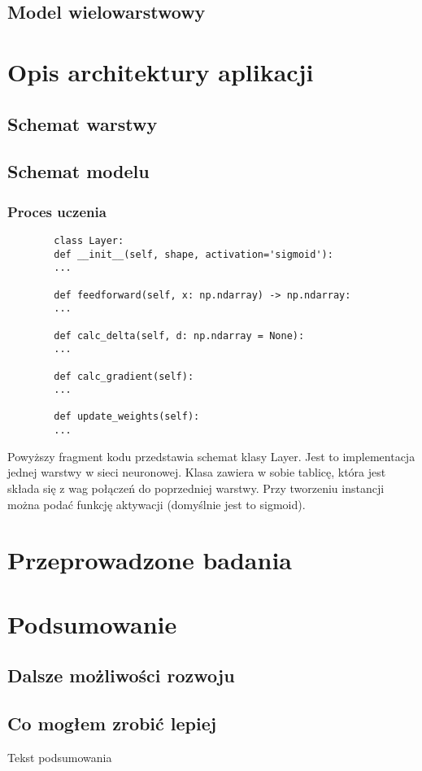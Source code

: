 \documentclass{report}
\begin{document}
    \section{Model wielowarstwowy}

    \chapter{Opis architektury aplikacji}

    \section{Schemat warstwy}

    \section{Schemat modelu}

    \subsection{Proces uczenia}

    \begin{lstlisting}
        class Layer:
        def __init__(self, shape, activation='sigmoid'):
        ...

        def feedforward(self, x: np.ndarray) -> np.ndarray:
        ...

        def calc_delta(self, d: np.ndarray = None):
        ...

        def calc_gradient(self):
        ...

        def update_weights(self):
        ...
    \end{lstlisting}
    \label{Schemat klasy Layer}


    Powyższy fragment kodu przedstawia schemat klasy Layer. Jest to implementacja jednej warstwy w sieci neuronowej.
    Klasa zawiera w sobie tablicę, która jest składa się z wag połączeń do poprzedniej warstwy.
    Przy tworzeniu instancji można podać funkcję aktywacji (domyślnie jest to sigmoid).



    \chapter{Przeprowadzone badania}

    \chapter{Podsumowanie}

    \section{Dalsze możliwości rozwoju}

    \section{Co mogłem zrobić lepiej}

    Tekst podsumowania

    
    

    \listoffigures
    \listoftables
\end{document}
